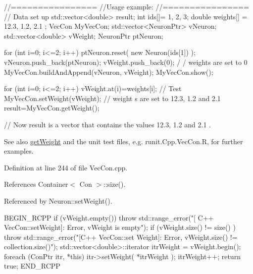 \begin{DoxyCode}
        //================
        //Usage example:
        //================
        // Data set up
                std::vector<double> result;
                        int ids[]= {1, 2, 3};
                        double weights[] = {12.3, 1.2, 2.1 };
                        VecCon MyVecCon;
                        std::vector<NeuronPtr> vNeuron;
                        std::vector<double> vWeight;
                        NeuronPtr ptNeuron;

                        for (int i=0; i<=2; i++) {
                        ptNeuron.reset( new Neuron(ids[1]) );
                        vNeuron.push_back(ptNeuron);
                        vWeight.push_back(0);                                   /
      / weights are set to 0
                        }
                        MyVecCon.buildAndAppend(vNeuron, vWeight);
                        MyVecCon.show();

                        for (int i=0; i<=2; i++) {
                                vWeight.at(i)=weights[i];
                        }
        // Test
                        MyVecCon.setWeight(vWeight);                    // weight
      s are set to 12.3, 1.2 and 2.1
                        result=MyVecCon.getWeight();

        // Now result is a vector that contains the values 12.3, 1.2 and 2.1 .
\end{DoxyCode}


\begin{DoxySeeAlso}{See also}
\hyperlink{class_vec_con_aafa37c30d566b8784ac84d23a14b5638}{getWeight} and the unit test files, e.g. runit.Cpp.VecCon.R, for further examples. 
\end{DoxySeeAlso}


Definition at line 244 of file VecCon.cpp.



References Container$<$ Con $>$::size().



Referenced by Neuron::setWeight().


\begin{DoxyCode}
                                                  {
        BEGIN_RCPP
        if (vWeight.empty()) { throw std::range_error("[ C++ VecCon::setWeight]: 
      Error, vWeight is empty"); }
        if (vWeight.size() != size() ) { throw std::range_error("[C++ VecCon::set
      Weight]: Error, vWeight.size() != collection.size()"); }
        std::vector<double>::iterator itrWeight = vWeight.begin();
        foreach (ConPtr itr, *this){
                itr->setWeight( *itrWeight );
                itrWeight++;
        }
        return true;
        END_RCPP
}
\end{DoxyCode}


